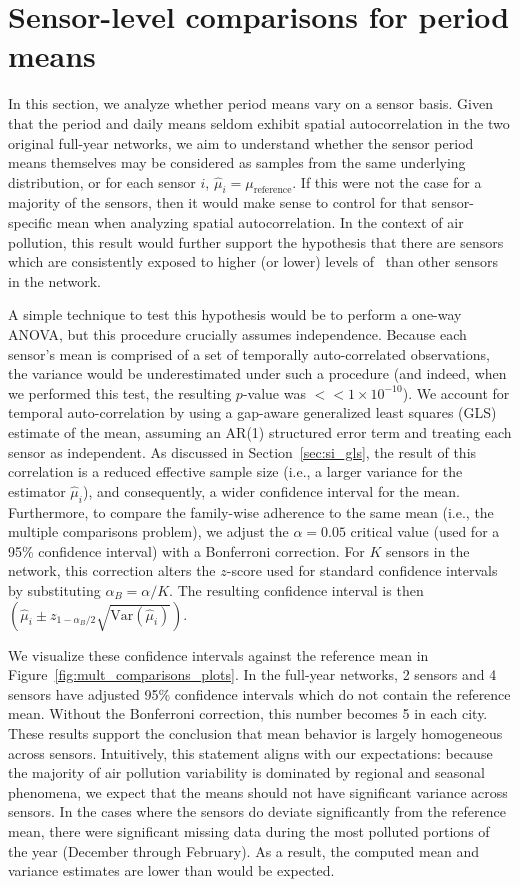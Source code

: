 \section{Sensor-level comparisons for period means}
\label{sec:annual_mean_comparison}
In this section, we analyze whether period means vary on a sensor basis. Given that the period and daily means seldom exhibit spatial autocorrelation in the two original full-year networks, we aim to understand whether the sensor period means themselves may be considered as samples from the same underlying distribution, or for each sensor $i$, $\hat{\mu}_i = \mu_{\text{reference}}$. If this were not the case for a majority of the sensors, then it would make sense to control for that sensor-specific mean when analyzing spatial autocorrelation. In the context of air pollution, this result would further support the hypothesis that there are sensors which are consistently exposed to higher (or lower) levels of \pmtt\ than other sensors in the network.

A simple technique to test this hypothesis would be to perform a one-way ANOVA, but this procedure crucially assumes independence. Because each sensor's mean is comprised of a set of temporally auto-correlated observations, the variance would be underestimated under such a procedure (and indeed, when we performed this test, the resulting $p$-value was $<<1\times10^{-10}$). We account for temporal auto-correlation by using a gap-aware generalized least squares (GLS) estimate of the mean, assuming an AR(1) structured error term and treating each sensor as independent. As discussed in Section~\ref{sec:si_gls}, the result of this correlation is a reduced effective sample size (i.e., a larger variance for the estimator $\hat{\mu}_i$), and consequently, a wider confidence interval for the mean. Furthermore, to compare the family-wise adherence to the same mean (i.e., the multiple comparisons problem), we adjust the $\alpha=0.05$ critical value (used for a 95\% confidence interval) with a Bonferroni correction. For $K$ sensors in the network, this correction alters the $z$-score used for standard confidence intervals by substituting $\alpha_{B}=\alpha/K$. The resulting confidence interval is then $(\hat{\mu}_i \pm z_{1-\alpha_B/2}\sqrt{\text{Var}(\hat{\mu}_i)})$.

We visualize these confidence intervals against the reference mean in Figure~\ref{fig:mult_comparisons_plots}. In the full-year networks, 2  sensors and 4  sensors have adjusted 95\% confidence intervals which do not contain the reference mean. Without the Bonferroni correction, this number becomes 5 in each city. These results support the conclusion that mean behavior is largely homogeneous across sensors. Intuitively, this statement aligns with our expectations: because the majority of air pollution variability is dominated by regional and seasonal phenomena, we expect that the means should not have significant variance across sensors. In the cases where the sensors do deviate significantly from the reference mean, there were significant missing data during the most polluted portions of the year (December through February). As a result, the computed mean and variance estimates are lower than would be expected.

